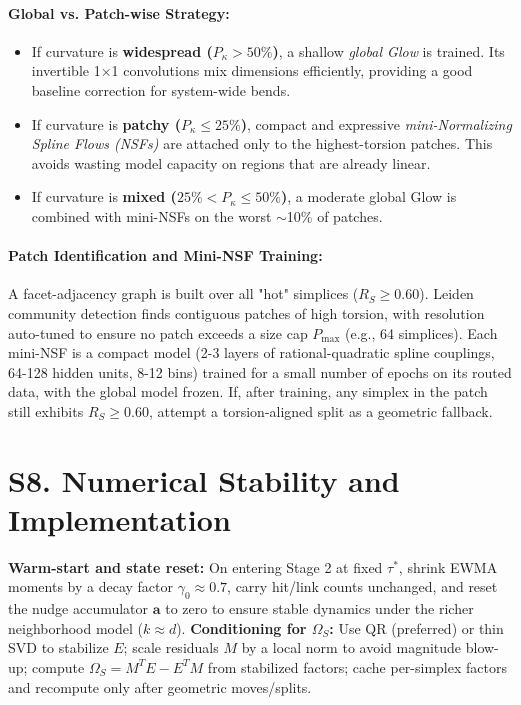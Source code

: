 \documentclass[11pt]{article}
\begin{document}
\paragraph{Global vs. Patch-wise Strategy:}
\begin{itemize}
  \item If curvature is \textbf{widespread ($P_\kappa > 50\%$)}, a shallow \emph{global Glow} is trained. Its invertible 1$\times$1 convolutions mix dimensions efficiently, providing a good baseline correction for system-wide bends.
  \item If curvature is \textbf{patchy ($P_\kappa \le 25\%$)}, compact and expressive \emph{mini-Normalizing Spline Flows (NSFs)} are attached only to the highest-torsion patches. This avoids wasting model capacity on regions that are already linear.
  \item If curvature is \textbf{mixed ($25\% < P_\kappa \le 50\%$)}, a moderate global Glow is combined with mini-NSFs on the worst $\sim$10\% of patches.
\end{itemize}

\paragraph{Patch Identification and Mini-NSF Training:}
A facet-adjacency graph is built over all "hot" simplices ($R_S \ge 0.60$). Leiden community detection finds contiguous patches of high torsion, with resolution auto-tuned to ensure no patch exceeds a size cap $P_{\max}$ (e.g., 64 simplices). Each mini-NSF is a compact model (2-3 layers of rational-quadratic spline couplings, 64-128 hidden units, 8-12 bins) trained for a small number of epochs on its routed data, with the global model frozen. If, after training, any simplex in the patch still exhibits $R_S \ge 0.60$, attempt a torsion-aligned split as a geometric fallback.

\section*{S8. Numerical Stability and Implementation}
\textbf{Warm-start and state reset:} On entering Stage 2 at fixed $\tau^*$, shrink EWMA moments by a decay factor $\gamma_0\approx 0.7$, carry hit/link counts unchanged, and reset the nudge accumulator $\mathbf a$ to zero to ensure stable dynamics under the richer neighborhood model ($k\approx d$).
\textbf{Conditioning for $\Omega_S$:} Use QR (preferred) or thin SVD to stabilize $E$; scale residuals $M$ by a local norm to avoid magnitude blow-up; compute $\Omega_S=M^TE{-}E^TM$ from stabilized factors; cache per-simplex factors and recompute only after geometric moves/splits.
\end{document}
